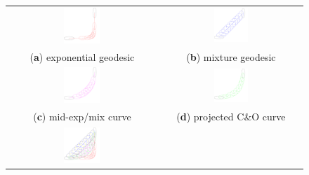 \documentclass[entropy,article,accept,oneauthor,pdftex,entropy]{Definitions/mdpi}
\begin{document}
\begin{Example}
\begin{itemize}
\begin{figure}[H]

\begin{tabular}{cc}
\includegraphics[width=0.25\textwidth]{BivariateNormal-52740-T.pdf} &
\includegraphics[width=0.25\textwidth]{BivariateNormal-52740-E.pdf} \\
(\textbf{a}) exponential geodesic & (\textbf{b}) mixture geodesic \\
\includegraphics[width=0.25\textwidth]{BivariateNormal-52740-ET.pdf} &
\includegraphics[width=0.25\textwidth]{BivariateNormal-52740-CO.pdf} \\
(\textbf{c}) mid-exp/mix curve & (\textbf{d}) projected C\&O curve \\
\includegraphics[width=0.25\textwidth]{BivariateNormal-52740-A.pdf} &

\end{tabular}
\end{figure}
\end{itemize}
\end{Example}
\end{document}
